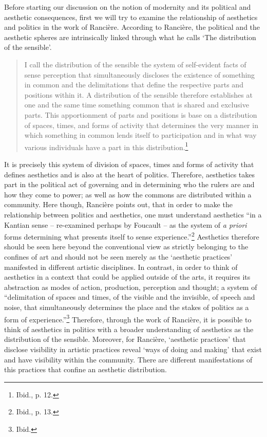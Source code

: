 Before starting our discussion on the notion of modernity and its political and aesthetic consequences, first we will try to examine the relationship of aesthetics and politics in the work of Ranci\`{e}re. According to Ranci\`{e}re, the political and the aesthetic spheres are intrinsically linked through what he calls `The distribution of the sensible'. 
\begin{quote}
I call the distribution of the sensible the system of self-evident facts of sense perception that simultaneously discloses the existence of something in common and the delimitations that define the respective parts and positions within it. A distribution of the sensible therefore establishes at one and the same time something common that is shared and exclusive parts. This apportionment of parts and positions is base on a distribution of spaces, times, and forms of activity that determines the very manner in which something in common lends itself to participation and in what way various individuals have a part in this distribution.\footnote{Ibid., p. 12.}
\end{quote}
It is precisely this system of division of spaces, times and forms of activity that defines aesthetics and is also at the heart of politics. Therefore, aesthetics takes part in the political act of governing and in determining who the rulers are and how they come to power; as well as how the commons are distributed within a community. Here though, Ranci\`{e}re points out, that in order to make the relationship between politics and aesthetics, one must understand aesthetics ``in a Kantian sense -- re-examined perhaps by Foucault -- as the system of \emph{a priori} forms determining what presents itself to sense experience.''\footnote{Ibid., p. 13.} Aesthetics therefore should be seen here beyond the conventional view as strictly belonging to the confines of art and should not be seen merely as the `aesthetic practices' manifested in different artistic disciplines.  In contrast, in order to think of aesthetics in a context that could be applied outside of the arts, it requires its abstraction as modes of action, production, perception and thought; a system of ``delimitation of spaces and times, of the visible and the invisible, of speech and noise, that simultaneously determines the place and the stakes of politics as a form of experience.''\footnote{Ibid.}
Therefore, through the work of Ranci\`{e}re, it is possible to think of aesthetics in politics with a broader understanding of aesthetics as the distribution of the sensible. Moreover, for Ranci\`{e}re, `aesthetic practices' that disclose visibility in artistic practices reveal `ways of doing and making' that exist and have visibility within the community. There are different manifestations of this practices that confine an aesthetic distribution.

